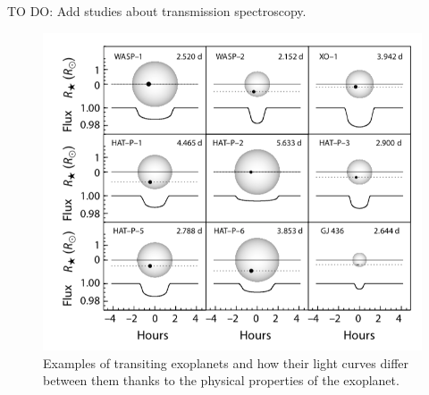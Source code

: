 TO DO: Add studies about transmission spectroscopy.            

\begin{figure}[H]
\centering
\includegraphics[width=0.8\columnwidth]{imagenes/transit_examples.png}
\caption{Examples of transiting exoplanets and how their light curves differ between them thanks to the physical properties of the exoplanet.}
\label{transit_examples}
\end{figure}


